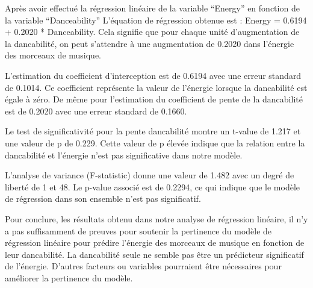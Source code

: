 \documentclass[
]{article}
\begin{document}
Après avoir effectué la régression linéaire de la variable ``Energy'' en
fonction de la variable ``Danceability'' L'équation de régression
obtenue est : Energy = 0.6194 + 0.2020 * Danceability. Cela signifie que
pour chaque unité d'augmentation de la dancabilité, on peut s'attendre à
une augmentation de 0.2020 dans l'énergie des morceaux de musique.

L'estimation du coefficient d'interception est de 0.6194 avec une erreur
standard de 0.1014. Ce coefficient représente la valeur de l'énergie
lorsque la dancabilité est égale à zéro. De même pour l'estimation du
coefficient de pente de la dancabilité est de 0.2020 avec une erreur
standard de 0.1660.

Le test de significativité pour la pente dancabilité montre un t-value
de 1.217 et une valeur de p de 0.229. Cette valeur de p élevée indique
que la relation entre la dancabilité et l'énergie n'est pas
significative dans notre modèle.

L'analyse de variance (F-statistic) donne une valeur de 1.482 avec un
degré de liberté de 1 et 48. Le p-value associé est de 0.2294, ce qui
indique que le modèle de régression dans son ensemble n'est pas
significatif.

Pour conclure, les résultats obtenu dans notre analyse de régression
linéaire, il n'y a pas suffisamment de preuves pour soutenir la
pertinence du modèle de régression linéaire pour prédire l'énergie des
morceaux de musique en fonction de leur dancabilité. La dancabilité
seule ne semble pas être un prédicteur significatif de l'énergie.
D'autres facteurs ou variables pourraient être nécessaires pour
améliorer la pertinence du modèle.
\end{document}
